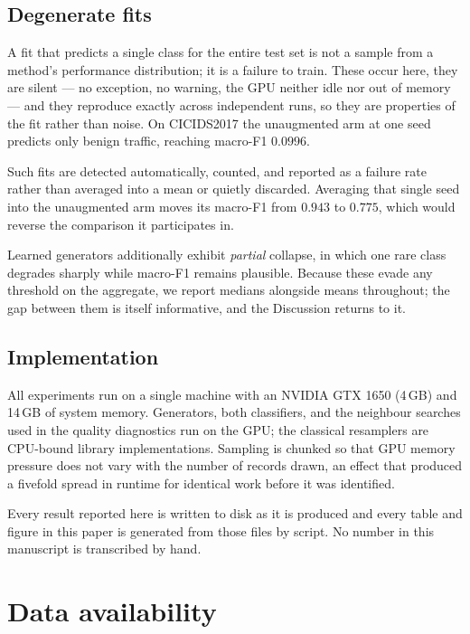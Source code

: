 \documentclass[11pt]{article}
\begin{document}
\subsection*{Degenerate fits}

A fit that predicts a single class for the entire test set is not a sample from a
method's performance distribution; it is a failure to train. These occur here, they
are silent --- no exception, no warning, the GPU neither idle nor out of memory ---
and they reproduce exactly across independent runs, so they are properties of the
fit rather than noise. On CICIDS2017 the unaugmented arm at one seed predicts only
benign traffic, reaching macro-F1 $0.0996$.

Such fits are detected automatically, counted, and reported as a failure rate rather
than averaged into a mean or quietly discarded. Averaging that single seed into the
unaugmented arm moves its macro-F1 from $0.943$ to $0.775$, which would reverse the
comparison it participates in.

Learned generators additionally exhibit \emph{partial} collapse, in which one rare
class degrades sharply while macro-F1 remains plausible. Because these evade any
threshold on the aggregate, we report medians alongside means throughout; the gap
between them is itself informative, and the Discussion returns to it.

\subsection*{Implementation}

All experiments run on a single machine with an NVIDIA GTX 1650 (4\,GB) and 14\,GB
of system memory. Generators, both classifiers, and the neighbour searches used in
the quality diagnostics run on the GPU; the classical resamplers are CPU-bound
library implementations. Sampling is chunked so that GPU memory pressure does not
vary with the number of records drawn, an effect that produced a fivefold spread in
runtime for identical work before it was identified.

Every result reported here is written to disk as it is produced and every table and
figure in this paper is generated from those files by script. No number in this
manuscript is transcribed by hand.



\section*{Data availability}
\end{document}
